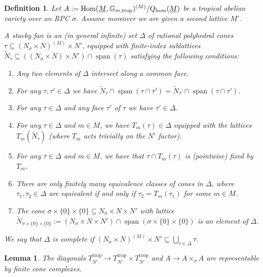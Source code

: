 \documentclass[10pt,a4paper]{amsart}
\newtheorem{lemma}{Lemma}
\newtheorem{definition}{Definition}
\DeclareMathOperator{\Hom}{\textup{Hom}}
\DeclareMathOperator{\Span}{span}
\def\hom{\mathrm{hom}}
\def\trop{\mathrm{trop}}
\begin{document}
\begin{definition}
	\label{def:stacky_fan}
	Let $A:=\Hom(\underline{M},\mathbb{G}_{m,\trop})^{(M)}/Q_{\hom}(\underline{M})$ be a tropical abelian variety
	over an RPC $\sigma$. Assume moreover we are given a second lattice $M'$.

	A stacky fan is an (in general infinite) set $\Delta$ of rational polyhedral cones $\tau\subseteq (N_{\sigma}\times N)^{(M)}\times N'$,
	equipped with finite-index sublattices $\tilde{N}_{\tau}\subseteq ((N_{\sigma}\times N)\times N')\cap \Span(\tau)$
	satisfying the following conditions:
		\begin{enumerate}
			\item Any two elements of $\Delta$ intersect along a common face.
			\item For any $\tau,\tau'\in \Delta$ we have $\tilde{N}_{\tau}\cap \Span(\tau\cap \tau')=\tilde{N}_{\tau'}\cap \Span(\tau\cap \tau')$.
			\item For any $\tau\in \Delta$ and any face $\tau'$ of $\tau$ we have $\tau'\in \Delta$.
			\item For any $\tau\in \Delta$ and $m\in M$, we have $T_m(\tau)\in \Delta$ equipped with the lattices $T_m(\tilde{N}_{\tau})$ (where $T_m$ acts trivially on the $N'$ factor).
			\item For any $\tau\in \Delta$ and $m\in M$, we have that $\tau\cap T_m(\tau)$ is (pointwise) fixed by $T_m$.
			\item There are only finitely many equivalence classes of cones in $\Delta$, where $\tau_1,\tau_2\in \Delta$ are equivalent if and only if $\tau_2=T_m(\tau_1)$ for some $m\in M$.
			\item The cone $\sigma\times\{0\}\times\{0\}\subseteq N_{\sigma}\times N\times N'$ with lattice
				$\tilde{N}_{\sigma\times \{0\}\times\{0\}}:=(N_{\sigma}\times N\times N')\cap \Span(\sigma\times \{0\}\times\{0\})$ is an element of $\Delta$.
		\end{enumerate}
		We say that $\Delta$ is complete if $(N_{\sigma}\times N)^{(M)}\times N'\subseteq \bigcup_{\tau\in \Delta}^{}\tau$.
\end{definition}

\begin{lemma}
	\label{lem:diag_repr}
	The diagonals $T_{N'}^{\trop}\to T_{N'}^{\trop}\times T_{N'}^{\trop}$ and
	$A\to A\times_{\sigma}A$ are representable by finite cone complexes.
\end{lemma}
\end{document}
